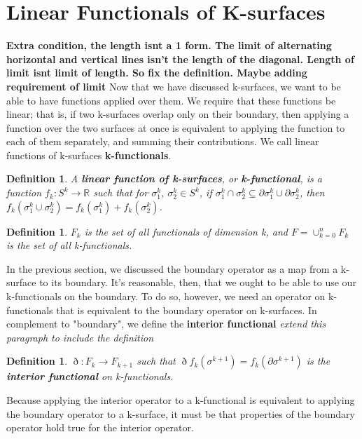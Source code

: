 \documentclass{book}
\newtheorem{defn}[equation]{Definition}
\begin{document}
\section{Linear Functionals of K-surfaces}


\textbf{Extra condition, the length isnt a 1 form. The limit of alternating horizontal and vertical lines isn't the length of the diagonal. Length of limit isnt limit of length. So fix the definition. Maybe adding requirement of limit}
Now that we have discussed k-surfaces, we want to be able to have functions applied over them. We require that these functions be linear; that is, if two k-surfaces overlap only on their boundary, then applying a function over the two surfaces at once is equivalent to applying the function to each of them separately, and summing their contributions. We call linear functions of k-surfaces \textbf{k-functionals}. 

\begin{defn}
	A \textbf{linear function of k-surfaces}, or \textbf{k-functional}, is a function $f_k : S^k \to \mathbb{R}$ such that for $\sigma^k_1$, $\sigma^k_2 \in S^k$, if $\sigma^k_1 \cap \sigma^k_2 \subseteq \partial \sigma^k_1 \cup \partial \sigma^k_2$, then $f_k(\sigma^k_1\cup \sigma^k_2) = f_k(\sigma^k_1) + f_k(\sigma^k_2)$. 
\end{defn}

\begin{defn}
	$F_k$ is the set of all functionals of dimension k, and $F = \cup_{k=0}^nF_k$ is the set of all k-functionals. 
\end{defn}

In the previous section, we discussed the boundary operator as a map from a k-surface to its boundary. It's reasonable, then, that we ought to be able to use our k-functionals on the boundary. To do so, however, we need an operator on k-functionals that is equivalent to the boundary operator on k-surfaces. In complement to "boundary", we define the \textbf{interior functional} \textit{extend this paragraph to include the definition}

\begin{defn}
	$\eth : F_k \to F_{k+1}$ such that $\eth f_k(\sigma^{k+1}) = f_k(\partial \sigma^{k+1})$ is the \textbf{interior functional} on k-functionals. 
\end{defn}

Because applying the interior operator to a k-functional is equivalent to applying the boundary operator to a k-surface, it must be that properties of the boundary operator hold true for the interior operator. 
\end{document}

